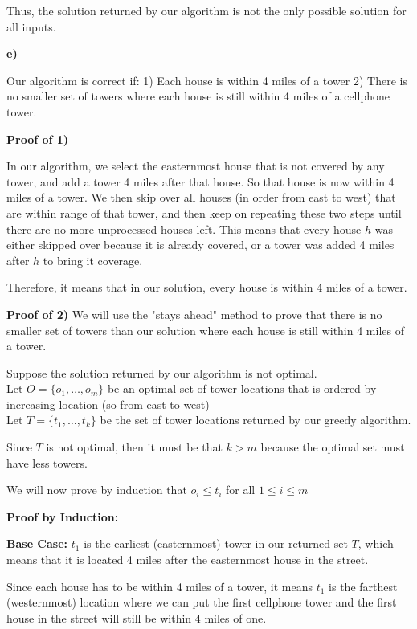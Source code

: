 \documentclass{article}
\begin{document}
Thus, the solution returned by our algorithm is not the only possible solution for all inputs.


\textbf{e)}

Our algorithm is correct if:
1) Each house is within 4 miles of a tower
2) There is no smaller set of towers where each house is still within 4 miles of a cellphone tower.

\textbf{Proof of 1)}

In our algorithm, we select the easternmost house that is not covered by any tower, and add a tower 4 miles after that house. So that house is now within 4 miles of a tower. We then skip over all houses (in order from east to west) that are within range of that tower, and then keep on repeating these two steps until there are no more unprocessed houses left.
This means that every house $h$ was either skipped over because it is already covered, or a tower was added 4 miles after $h$ to bring it coverage. 

Therefore, it means that in our solution, every house is within 4 miles of a tower.


\textbf{Proof of 2)}
We will use the "stays ahead" method to prove that there is no smaller set of towers than our solution where each house is still within 4 miles of a tower.

Suppose the solution returned by our algorithm is not optimal.\\
Let $O = \{o_1, \dotsc, o_m\}$ be an optimal set of tower locations that is ordered by increasing location (so from east to west)\\
Let $T = \{t_1, \dotsc, t_k\}$ be the set of tower locations returned by our greedy algorithm. 

Since $T$ is not optimal, then it must be that $k > m$ because the optimal set must have less towers.

We will now prove by induction that $o_i \leq t_i$ for all $1 \leq i \leq m$

\textbf{Proof by Induction:}

\textbf{Base Case:}
$t_1$ is the earliest (easternmost) tower in our returned set $T$, which means that it is located 4 miles after the easternmost house in the street. 

Since each house has to be within 4 miles of a tower, it means $t_1$ is the farthest (westernmost) location where we can put the first cellphone tower and the first house in the street will still be within 4 miles of one.
\end{document}
